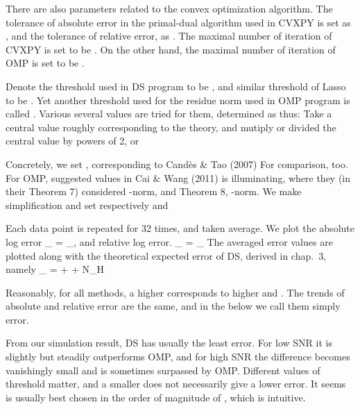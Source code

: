 There are also parameters related to the convex optimization algorithm.
The tolerance of absolute error in the primal-dual algorithm used in CVXPY is set as , and the tolerance of relative error, as .
The maximal number of iteration of CVXPY is set to be .
On the other hand, the maximal number of iteration of OMP is set to be .

Denote the threshold used in DS program to be , and similar threshold of Lasso to be .
Yet another threshold used for the residue norm used in OMP program is called \m {\eta}.
Various several values are tried for them, determined as thus: Take a central value roughly corresponding to the theory, and mutiply or divided the central value by powers of 2, or 

Concretely, we set , corresponding to Cand\`es \& Tao (2007)
For comparison,  too.
For OMP, suggested values in Cai \& Wang (2011) is illuminating, where they (in their Theorem 7) considered -norm, and Theorem 8, \m {\ell _\infty}-norm.
We make simplification and set respectively  and 

Each data point is repeated for 32 times, and taken average.
We plot the absolute log error
%
 {
\NC \e_{}
=\NC {} _{}, \NR
}
%
and relative log error.
%
 {
\NC \e_{}
=\NC {}
{ _{}} \NR
}
%
The averaged error values are plotted along with the theoretical expected error of DS, derived in chap.\ 3, namely
%
 {
\NC \e_{}
=\NC {} + \log {} + \log \log N_H \NR
}

\stopsubsection

\startsubsection [title={Plots}]

\stopsubsection

\startsubsection [title={Discussion}]

Reasonably, for all methods, a higher \m {\s} corresponds to higher  and .
The trends of absolute and relative error are the same, and in the below we call them simply error.

From our simulation result, DS has usually the least error.
For low SNR it is slightly but steadily outperforms OMP, and for high SNR the difference becomes vanishingly small and is sometimes surpassed by OMP.
Different values of threshold  matter, and a smaller  does not necessarily give a lower error.
It seems  is usually best chosen in the order of magnitude of \m {\s}, which is intuitive.

